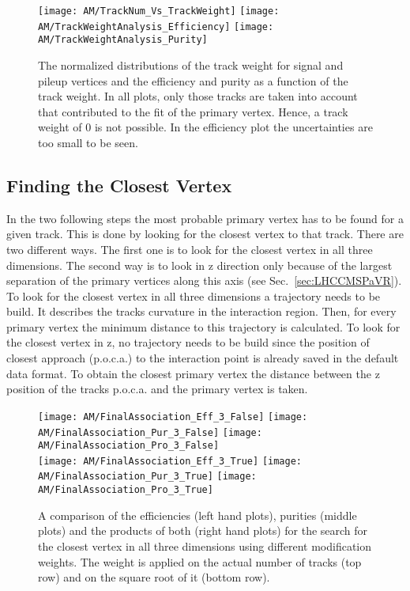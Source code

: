 \begin{figure}[Ht]
    \centering
    \texttt{[image: AM/TrackNum\_Vs\_TrackWeight]}
    \texttt{[image: AM/TrackWeightAnalysis\_Efficiency]}
    \texttt{[image: AM/TrackWeightAnalysis\_Purity]}
    \caption[Distribution of the track weight and efficiency and purity \vs{} track weight]{The normalized distributions of the track weight for signal and pileup vertices and the efficiency and purity as a function of the track weight. In all plots, only those tracks are taken into account that contributed to the fit of the primary vertex. Hence, a track weight of 0 is not possible. In the efficiency plot the uncertainties are too small to be seen.  \label{plot:AMTWdistpureff}}
\end{figure}

\subsection{Finding the Closest Vertex\label{sec:AMWFCV}}

In the two following steps the most probable primary vertex has to be found for a given track. This is done by looking for the closest vertex to that track. There are two different ways. The first one is to look for the closest vertex in all three dimensions. The second way is to look in z direction only because of the largest separation of the primary vertices along this axis (see Sec.~\ref{sec:LHCCMSPaVR}). \\
To look for the closest vertex in all three dimensions a trajectory needs to be build. It describes the tracks curvature in the interaction region. Then, for every primary vertex the minimum distance to this trajectory is calculated. To look for the closest vertex in z, no trajectory needs to be build since the position of closest approach (p.o.c.a.) to the interaction point is already saved in the default data format. To obtain the closest primary vertex the distance between the z position of the tracks p.o.c.a. and the primary vertex is taken.

\begin{figure}[Ht]
    \centering
    \texttt{[image: AM/FinalAssociation\_Eff\_3\_False]}
    \texttt{[image: AM/FinalAssociation\_Pur\_3\_False]}
    \texttt{[image: AM/FinalAssociation\_Pro\_3\_False]}
    \\
    \texttt{[image: AM/FinalAssociation\_Eff\_3\_True]}
    \texttt{[image: AM/FinalAssociation\_Pur\_3\_True]}
    \texttt{[image: AM/FinalAssociation\_Pro\_3\_True]}
    \caption[Efficiencies, purities and their product using different modification weights for the search in three dimensions.]{A comparison of the efficiencies (left hand plots), purities (middle plots) and the products of both (right hand plots) for the search for the closest vertex in all three dimensions using different modification weights. The weight is applied on the actual number of tracks (top row) and on the square root of it (bottom row).\label{plot:AMWFCV3D}}
\end{figure}


